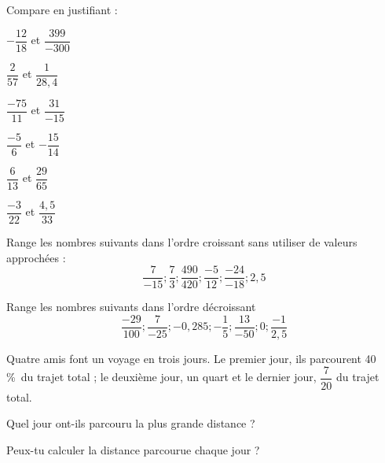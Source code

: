 \begin{exercice}

Compare en justifiant :

\begin{colenumerate}{2} 
\item $-\dfrac{12}{18}$ et $\dfrac{399}{-300}$ 
\item $\dfrac{2}{57}$ et $\dfrac{1}{28,4}$ 
\item $\dfrac{-75}{11}$ et $\dfrac{31}{-15}$ 
\item $\dfrac{-5}{6}$ et $-\dfrac{15}{14}$ 
\item $\dfrac{6}{13}$ et $\dfrac{29}{65}$ 
\item $\dfrac{-3}{22}$ et $\dfrac{4,5}{33}$
\end{colenumerate} 
\end{exercice}

\begin{exercice}

\begin{colenumerate}{1} 
\item Range les nombres suivants dans l'ordre croissant sans utiliser de valeurs approchées :
\[ \dfrac{7}{-15} ; \dfrac{7}{3} ; \dfrac{490}{420} ; \dfrac{-5}{12} ; \dfrac{-24}{-18} ; 2,5\]
\item Range les nombres suivants dans l'ordre décroissant
\[ \dfrac{-29}{100} ; \dfrac{7}{-25} ; -0,285 ; -\dfrac{1}{5} ; \dfrac{13}{-50} ; 0 ; \dfrac{-1}{2,5} \]
\end{colenumerate} 
\end{exercice}

\begin{exercice}[Trajet]
Quatre amis font un voyage en trois jours. Le premier jour, ils parcourent 40\,\%\ du trajet total ; le deuxième jour, un quart et le dernier jour, $\dfrac{7}{20}$ du trajet total.

Quel jour ont-ils parcouru la plus grande distance ?

Peux-tu calculer la distance parcourue chaque jour ?
\end{exercice}







